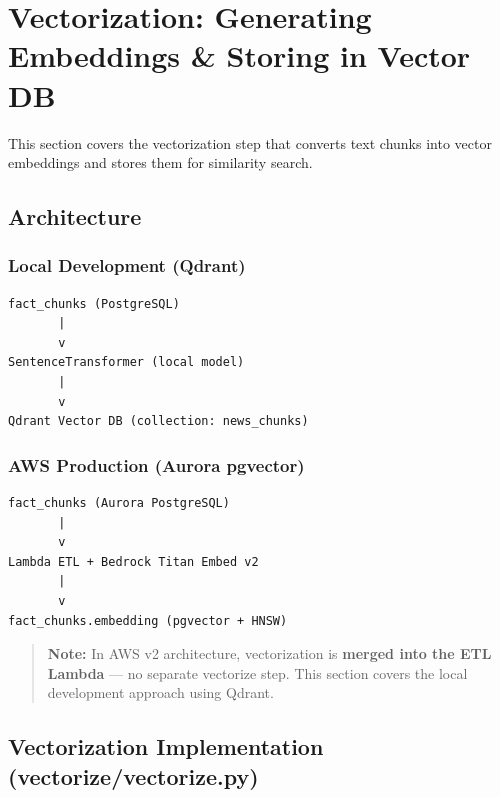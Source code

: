 \hypertarget{vectorization-generating-embeddings-storing-in-vector-db}{%
\section{Vectorization: Generating Embeddings \& Storing in Vector
DB}}

This section covers the vectorization step that converts text chunks
into vector embeddings and stores them for similarity search.

\hypertarget{architecture}{%
\subsection{Architecture}}

\hypertarget{local-development-qdrant}{%
\subsubsection{Local Development
(Qdrant)}}

\begin{verbatim}
fact_chunks (PostgreSQL)
       |
       v
SentenceTransformer (local model)
       |
       v
Qdrant Vector DB (collection: news_chunks)
\end{verbatim}

\hypertarget{aws-production-aurora-pgvector}{%
\subsubsection{AWS Production (Aurora
pgvector)}}

\begin{verbatim}
fact_chunks (Aurora PostgreSQL)
       |
       v
Lambda ETL + Bedrock Titan Embed v2
       |
       v
fact_chunks.embedding (pgvector + HNSW)
\end{verbatim}

\begin{quote}
\textbf{Note:} In AWS v2 architecture, vectorization is \textbf{merged
into the ETL Lambda} --- no separate vectorize step. This section covers
the local development approach using Qdrant.
\end{quote}

\hypertarget{vectorization-implementation-vectorizevectorize.py}{%
\subsection{Vectorization Implementation
(vectorize/vectorize.py)}}

